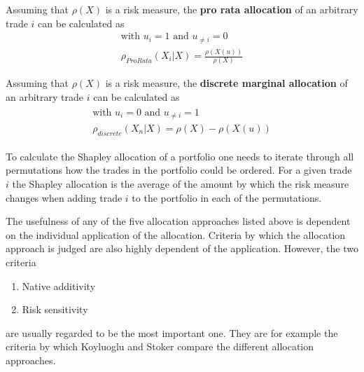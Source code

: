\documentclass[../Thesis_AHoecherl.tex]{subfiles}
\begin{document}
\begin{definition}[\label{def:pro rata allocation}]
    Assuming that $\rho\left(X\right)$ is a risk measure, the \textbf{pro rata allocation} of an arbitrary trade $i$ can be calculated as
    \begin{gather}
        \text{with } u_{i} = 1 \text{ and } u_{\neq i} = 0\\
        \rho_{ProRata}\left(X_i|X\right) = \frac{\rho(X(u))}{\rho(X)}
    \end{gather}
\end{definition}

\begin{definition}
    Assuming that $\rho(X)$ is a risk measure, the \textbf{discrete marginal allocation} of an arbitrary trade $i$ can be calculated as
    \begin{gather}
        \begin{split}
            \text{with } u_{i} = 0 \text{ and } u_{\neq i} = 1\\
            \rho_{discrete}\left(X_n|X\right) = \rho\left(X\right) - \rho\left(X\left(u\right)\right)    
        \end{split}
    \end{gather}
\end{definition}

To calculate the Shapley allocation of a portfolio one needs to iterate through all permutations how the trades in the portfolio could be ordered.
For a given trade $i$ the Shapley allocation is the average of the amount by which the risk measure changes when adding trade $i$ to the portfolio in each of the permutations.

\begin{definition}
\end{definition}

The usefulness of any of the five allocation approaches listed above is dependent on the individual application of the allocation. Criteria by which the allocation approach is judged are also highly dependent of the application. However, the two criteria
\begin{enumerate}
    \item Native additivity
    \item Risk sensitivity
\end{enumerate}
are usually regarded to be the most important one. They are for example the criteria by which Koyluoglu and Stoker \cite{koyluoglu2002risk} compare the different allocation approaches.
\end{document}
